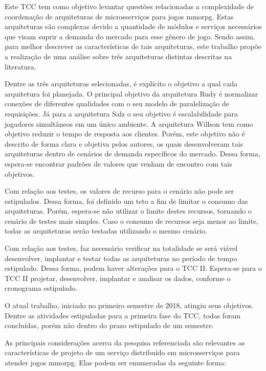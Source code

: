 Este TCC tem como objetivo levantar questões relacionadas a complexidade de coordenação de arquiteturas de microsserviços para jogos \ac{mmorpg}.
%
Estas arquiteturas são complexas devido a quantidade de módulos e serviços necessários que visam suprir a demanda do mercado para esse gênero de jogo.
%
Sendo assim, para melhor descrever as características de tais arquiteturas, este trabalho propõe a realização de uma análise sobre três arquiteturas distintas descritas na literatura.


Dentre as três arquiteturas selecionadas, é explícito o objetivo a qual cada arquitetura foi planejada.
%
O principal objetivo da arquitetura Rudy é normalizar conexões de diferentes qualidades com o seu modelo de paralelização de requisições.
%
Já para a arquitetura Salz o seu objetivo é escalabilidade para jogadores simultâneos em um único ambiente.
%
A arquitetura Willson tem como objetivo reduzir o tempo de resposta aos clientes.
%
Porém, este objetivo não é descrito de forma clara e objetiva pelos autores, os quais desenvolveram tais arquiteturas dentro de cenários de demanda específicos do mercado.
%
Dessa forma, espera-se encontrar padrões de valores que venham de encontro com tais objetivos.

Com relação aos testes, os valores de recurso para o cenário não pode ser estipulados.
%
Dessa forma, foi definido um teto a fim de limitar o consumo das arquiteturas.
%
Porém, espera-se não utilizar o limite destes recursos, tornando o cenário de testes mais simples.
%
Caso o consumo de recursos seja menor ao limite, todas as arquiteturas serão testadas utilizando o mesmo cenário.

Com relação aos testes, faz necessário verificar na totalidade se será viável desenvolver, implantar e testar todas as arquiteturas no período de tempo estipulado.
%
Dessa forma, podem haver alterações para o TCC II.
%
Espera-se para o TCC II projetar, desenvolver, implantar e analisar os dados, conforme o cronograma estipulado.

O atual trabalho, iniciado no primeiro semestre de 2018, atingiu seus objetivos.
%
Dentre as atividades estipuladas para a primeira fase do TCC, todas foram concluídas, porém não dentro do prazo estipulado de um semestre.

As principais considerações acerca da pesquisa referenciada são relevantes as características de projeto de um serviço distribuído em microsserviços para atender jogos \ac{mmorpg}.
%
Elas podem ser enumeradas da seguinte forma:

